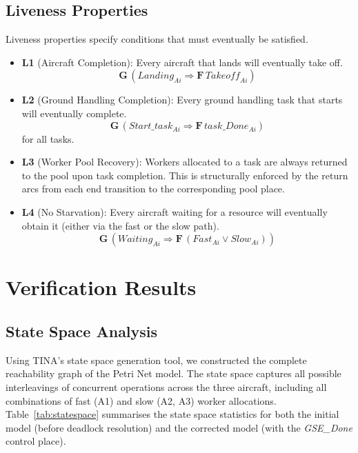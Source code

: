 \documentclass[conference]{IEEEtran}
\begin{document}
\subsection{Liveness Properties}

Liveness properties specify conditions that must eventually be satisfied.

\begin{itemize}
  \item \textbf{L1} (Aircraft Completion): Every aircraft that lands will
    eventually take off.
    \[
      \mathbf{G}\,(\mathit{Landing}_{Ai} \Rightarrow \mathbf{F}\,\mathit{Takeoff}_{Ai})
    \]

  \item \textbf{L2} (Ground Handling Completion): Every ground handling task
    that starts will eventually complete.
    \[
      \mathbf{G}\,(\mathit{Start\_task}_{Ai} \Rightarrow \mathbf{F}\,\mathit{task\_Done}_{Ai})
    \]
    for all tasks.

  \item \textbf{L3} (Worker Pool Recovery): Workers allocated to a task are
    always returned to the pool upon task completion. This is structurally
    enforced by the return arcs from each end transition to the corresponding
    pool place.

  \item \textbf{L4} (No Starvation): Every aircraft waiting for a resource will
    eventually obtain it (either via the fast or the slow path).
    \[
      \mathbf{G}\,(\mathit{Waiting}_{Ai} \Rightarrow
        \mathbf{F}\,(\mathit{Fast}_{Ai} \vee \mathit{Slow}_{Ai}))
    \]
\end{itemize}


\section{Verification Results}

\subsection{State Space Analysis}

Using TINA's state space generation tool, we constructed the complete
reachability graph of the Petri Net model. The state space captures all possible
interleavings of concurrent operations across the three aircraft, including all
combinations of fast (A1) and slow (A2, A3) worker allocations.
Table~\ref{tab:statespace} summarises the state space statistics for both the
initial model (before deadlock resolution) and the corrected model (with the
\textit{GSE\_Done} control place).
\end{document}

